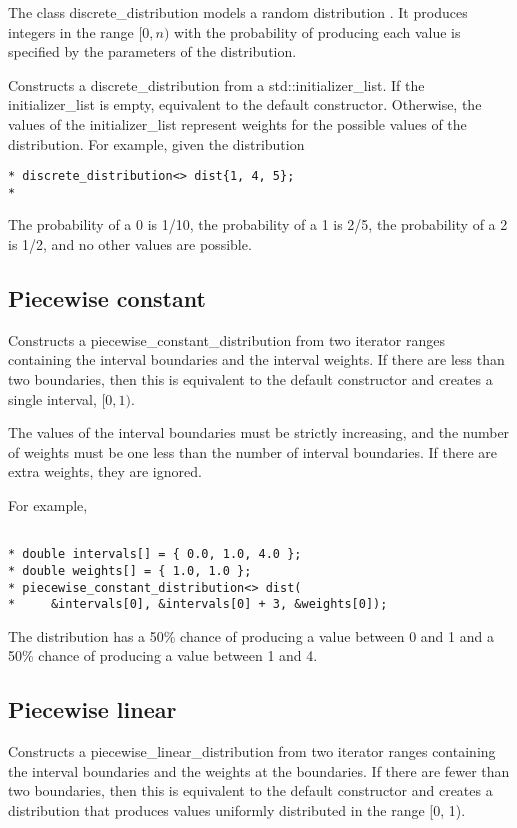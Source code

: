 The class discrete\_distribution models a random distribution . It produces integers in the range $[0, n)$ with the probability of producing each value is specified by the parameters of the distribution. 

Constructs a discrete\_distribution from a std::initializer\_list. If the initializer\_list is empty, equivalent to the default constructor. Otherwise, the values of the initializer\_list represent weights for the possible values of the distribution. For example, given the distribution
\begin{verbatim}
* discrete_distribution<> dist{1, 4, 5};
* 
\end{verbatim}

The probability of a 0 is 1/10, the probability of a 1 is 2/5, the probability of a 2 is 1/2, and no other values are possible. 



\subsection{Piecewise constant}
Constructs a piecewise\_constant\_distribution from two iterator ranges containing the interval boundaries and the interval weights. If there are less than two boundaries, then this is equivalent to the default constructor and creates a single interval, $[0, 1)$.

The values of the interval boundaries must be strictly increasing, and the number of weights must be one less than the number of interval boundaries. If there are extra weights, they are ignored.

For example,
\begin{verbatim}

* double intervals[] = { 0.0, 1.0, 4.0 };
* double weights[] = { 1.0, 1.0 };
* piecewise_constant_distribution<> dist(
*     &intervals[0], &intervals[0] + 3, &weights[0]);

\end{verbatim}

The distribution has a 50\% chance of producing a value between 0 and 1 and a 50\% chance of producing a value between 1 and 4. 



\subsection{Piecewise linear}
Constructs a piecewise\_linear\_distribution from two iterator ranges containing the interval boundaries and the weights at the boundaries. If there are fewer than two boundaries, then this is equivalent to the default constructor and creates a distribution that produces values uniformly distributed in the range [0, 1).

